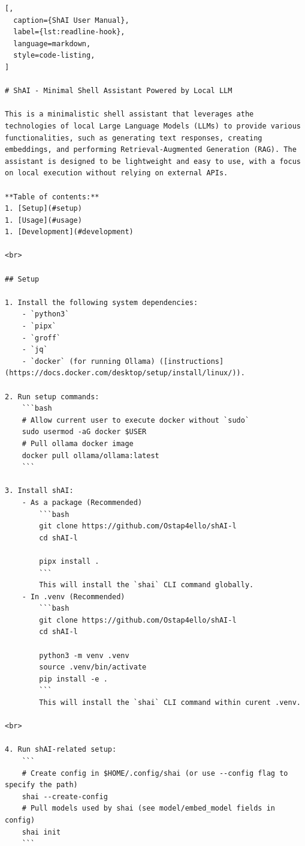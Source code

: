 \label{a-shai-readme}


\begin{lstlisting}[,
  caption={ShAI User Manual},
  label={lst:readline-hook},
  language=markdown,
  style=code-listing,
]

# ShAI - Minimal Shell Assistant Powered by Local LLM

This is a minimalistic shell assistant that leverages athe technologies of local Large Language Models (LLMs) to provide various functionalities, such as generating text responses, creating embeddings, and performing Retrieval-Augmented Generation (RAG). The assistant is designed to be lightweight and easy to use, with a focus on local execution without relying on external APIs.

**Table of contents:**
1. [Setup](#setup)
1. [Usage](#usage)
1. [Development](#development)

<br>

## Setup

1. Install the following system dependencies:
    - `python3`
    - `pipx`
    - `groff`
    - `jq`
    - `docker` (for running Ollama) ([instructions](https://docs.docker.com/desktop/setup/install/linux/)).

2. Run setup commands:
    ```bash
    # Allow current user to execute docker without `sudo`
    sudo usermod -aG docker $USER
    # Pull ollama docker image
    docker pull ollama/ollama:latest
    ```

3. Install shAI:
    - As a package (Recommended)
        ```bash
        git clone https://github.com/Ostap4ello/shAI-l
        cd shAI-l

        pipx install .
        ```
        This will install the `shai` CLI command globally.
    - In .venv (Recommended)
        ```bash
        git clone https://github.com/Ostap4ello/shAI-l
        cd shAI-l

        python3 -m venv .venv
        source .venv/bin/activate
        pip install -e .
        ```
        This will install the `shai` CLI command within curent .venv.

<br>

4. Run shAI-related setup:
    ```
    # Create config in $HOME/.config/shai (or use --config flag to specify the path)
    shai --create-config
    # Pull models used by shai (see model/embed_model fields in config)
    shai init
    ```



\end{lstlisting}

